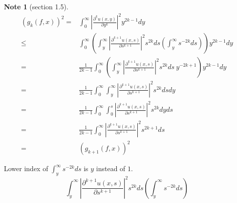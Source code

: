 \documentclass{report}
\theoremstyle{definition}
\newtheorem{note}{Note}
\theoremstyle{definition}
\theoremstyle{plain}
\numberwithin{theorem}{section}
\numberwithin{remark}{section}
\numberwithin{equation}{section}
\newcommand{\abs}[1]{\left\lvert#1\right\rvert}
\begin{document}
\begin{note}[section 1.5]
    \begin{align*}
        (g_k(f,x))^2=&\int_{0}^{\infty}\abs{\frac{\partial^{k}u(x,y)}{\partial y^{k}}}^2y^{2k-1}d y\\
        \leq&\int_{0}^{\infty}\left( \int_{y}^{\infty}\abs{\frac{\partial^{k+1}u(x,s)}{\partial s^{k+1}}}^2s^{2k}ds\left( \int_{y}^{\infty}s^{-2k}ds \right) \right) y^{2k-1}d y\\
        =&\frac{1}{2k-1}\int_{0}^{\infty}\left( \int_{y}^{\infty}\abs{\frac{\partial^{k+1}u(x,s)}{\partial s^{k+1}}}^2s^{2k}ds ~y^{-2k+1} \right) y^{2k-1}d y\\
        =&\frac{1}{2k-1}\int_{0}^{\infty} \int_{y}^{\infty}\abs{\frac{\partial^{k+1}u(x,s)}{\partial s^{k+1}}}^2s^{2k}ds d y\\
        =&\frac{1}{2k-1}\int_{0}^{\infty} \int_{0}^{s}\abs{\frac{\partial^{k+1}u(x,s)}{\partial s^{k+1}}}^2s^{2k}d y ds\\
        =&\frac{1}{2k-1}\int_{0}^{\infty} \abs{\frac{\partial^{k+1}u(x,s)}{\partial s^{k+1}}}^2s^{2k+1} ds\\
        =&(g_{k+1}(f,x))^2
    \end{align*}    
\end{note}
\begin{errata}[P86]
    Lower index of $\int_{y}^{\infty}s^{-2k}ds$ is $y$ instead of $1$.
    \begin{equation*}
        \int_{y}^{\infty}\abs{\frac{\partial^{k+1}u(x,s)}{\partial s^{k+1}}}^2s^{2k}ds\left( \int_{y}^{\infty}s^{-2k}ds \right)
    \end{equation*}
\end{errata}
\end{document}

